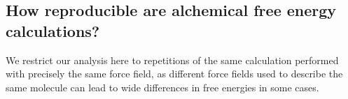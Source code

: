 \documentclass[9pt,bestpractices]{livecoms}
\begin{document}

\subsection{How reproducible are alchemical free energy calculations?}
\label{subsec:reproducible}
We restrict our analysis here to repetitions of the same calculation performed with precisely the same force field, as different force fields used to describe the same molecule can lead to wide differences in free energies in some cases.  
\end{document}
